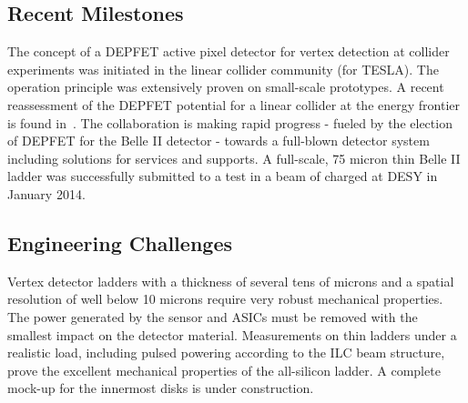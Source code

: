 \subsection{Recent Milestones}
The concept of a DEPFET active pixel detector for vertex detection at collider experiments was initiated in the linear collider community (for TESLA).
The operation principle was extensively proven on small-scale prototypes. A recent reassessment of the DEPFET potential for a linear collider at the energy frontier is found in~\cite{6484214}.
The collaboration is making rapid progress - fueled by the election of DEPFET for the Belle II detector - towards a full-blown detector system including solutions for services and supports.
A full-scale, 75 micron thin Belle II ladder was successfully submitted to a test in a beam of charged at DESY in January 2014.

\subsection{Engineering Challenges}
Vertex detector ladders with a thickness of several tens of microns and a spatial resolution of well below 10 microns require very robust mechanical properties. The power generated by the sensor and ASICs must be removed with the smallest impact on the detector material.
Measurements on thin ladders under a realistic load, including pulsed powering according to the ILC beam structure, prove the excellent mechanical properties of the all-silicon ladder. A complete mock-up for the innermost disks is under construction.

